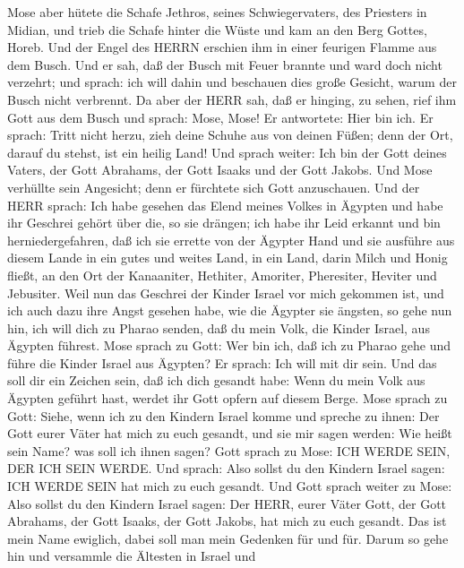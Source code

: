  Mose aber hütete die Schafe Jethros, seines
Schwiegervaters, des Priesters in Midian, und trieb die Schafe hinter
die Wüste und kam an den Berg Gottes, Horeb.  Und der Engel
des HERRN erschien ihm in einer feurigen Flamme aus dem Busch. Und er
sah, daß der Busch mit Feuer brannte und ward doch nicht verzehrt;
 und sprach: ich will dahin und beschauen dies große
Gesicht, warum der Busch nicht verbrennt.  Da aber der HERR
sah, daß er hinging, zu sehen, rief ihm Gott aus dem Busch und sprach:
Mose, Mose! Er antwortete: Hier bin ich.  Er sprach: Tritt
nicht herzu, zieh deine Schuhe aus von deinen Füßen; denn der Ort,
darauf du stehst, ist ein heilig Land!  Und sprach weiter:
Ich bin der Gott deines Vaters, der Gott Abrahams, der Gott Isaaks und
der Gott Jakobs. Und Mose verhüllte sein Angesicht; denn er fürchtete
sich Gott anzuschauen.  Und der HERR sprach: Ich habe
gesehen das Elend meines Volkes in Ägypten und habe ihr Geschrei gehört
über die, so sie drängen; ich habe ihr Leid erkannt  und bin
herniedergefahren, daß ich sie errette von der Ägypter Hand und sie
ausführe aus diesem Lande in ein gutes und weites Land, in ein Land,
darin Milch und Honig fließt, an den Ort der Kanaaniter, Hethiter,
Amoriter, Pheresiter, Heviter und Jebusiter.  Weil nun das
Geschrei der Kinder Israel vor mich gekommen ist, und ich auch dazu ihre
Angst gesehen habe, wie die Ägypter sie ängsten,  so gehe
nun hin, ich will dich zu Pharao senden, daß du mein Volk, die Kinder
Israel, aus Ägypten führest.  Mose sprach zu Gott: Wer bin
ich, daß ich zu Pharao gehe und führe die Kinder Israel aus Ägypten?
 Er sprach: Ich will mit dir sein. Und das soll dir ein
Zeichen sein, daß ich dich gesandt habe: Wenn du mein Volk aus Ägypten
geführt hast, werdet ihr Gott opfern auf diesem Berge. 
Mose sprach zu Gott: Siehe, wenn ich zu den Kindern Israel komme und
spreche zu ihnen: Der Gott eurer Väter hat mich zu euch gesandt, und sie
mir sagen werden: Wie heißt sein Name? was soll ich ihnen sagen?
 Gott sprach zu Mose: ICH WERDE SEIN, DER ICH SEIN WERDE.
Und sprach: Also sollst du den Kindern Israel sagen: ICH WERDE SEIN hat
mich zu euch gesandt.  Und Gott sprach weiter zu Mose: Also
sollst du den Kindern Israel sagen: Der HERR, eurer Väter Gott, der Gott
Abrahams, der Gott Isaaks, der Gott Jakobs, hat mich zu euch gesandt.
Das ist mein Name ewiglich, dabei soll man mein Gedenken für und für.
 Darum so gehe hin und versammle die Ältesten in Israel und
